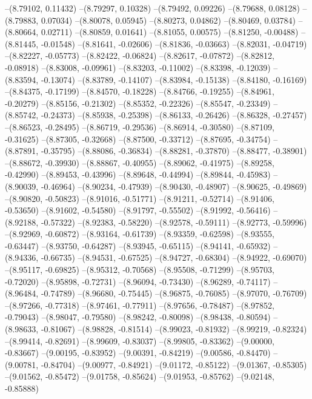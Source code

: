 --(8.79102, 0.11432)
--(8.79297, 0.10328)
--(8.79492, 0.09226)
--(8.79688, 0.08128)
--(8.79883, 0.07034)
--(8.80078, 0.05945)
--(8.80273, 0.04862)
--(8.80469, 0.03784)
--(8.80664, 0.02711)
--(8.80859, 0.01641)
--(8.81055, 0.00575)
--(8.81250, -0.00488)
--(8.81445, -0.01548)
--(8.81641, -0.02606)
--(8.81836, -0.03663)
--(8.82031, -0.04719)
--(8.82227, -0.05773)
--(8.82422, -0.06824)
--(8.82617, -0.07872)
--(8.82812, -0.08918)
--(8.83008, -0.09961)
--(8.83203, -0.11002)
--(8.83398, -0.12039)
--(8.83594, -0.13074)
--(8.83789, -0.14107)
--(8.83984, -0.15138)
--(8.84180, -0.16169)
--(8.84375, -0.17199)
--(8.84570, -0.18228)
--(8.84766, -0.19255)
--(8.84961, -0.20279)
--(8.85156, -0.21302)
--(8.85352, -0.22326)
--(8.85547, -0.23349)
--(8.85742, -0.24373)
--(8.85938, -0.25398)
--(8.86133, -0.26426)
--(8.86328, -0.27457)
--(8.86523, -0.28495)
--(8.86719, -0.29536)
--(8.86914, -0.30580)
--(8.87109, -0.31625)
--(8.87305, -0.32668)
--(8.87500, -0.33712)
--(8.87695, -0.34754)
--(8.87891, -0.35795)
--(8.88086, -0.36834)
--(8.88281, -0.37870)
--(8.88477, -0.38901)
--(8.88672, -0.39930)
--(8.88867, -0.40955)
--(8.89062, -0.41975)
--(8.89258, -0.42990)
--(8.89453, -0.43996)
--(8.89648, -0.44994)
--(8.89844, -0.45983)
--(8.90039, -0.46964)
--(8.90234, -0.47939)
--(8.90430, -0.48907)
--(8.90625, -0.49869)
--(8.90820, -0.50823)
--(8.91016, -0.51771)
--(8.91211, -0.52714)
--(8.91406, -0.53650)
--(8.91602, -0.54580)
--(8.91797, -0.55502)
--(8.91992, -0.56416)
--(8.92188, -0.57322)
--(8.92383, -0.58220)
--(8.92578, -0.59111)
--(8.92773, -0.59996)
--(8.92969, -0.60872)
--(8.93164, -0.61739)
--(8.93359, -0.62598)
--(8.93555, -0.63447)
--(8.93750, -0.64287)
--(8.93945, -0.65115)
--(8.94141, -0.65932)
--(8.94336, -0.66735)
--(8.94531, -0.67525)
--(8.94727, -0.68304)
--(8.94922, -0.69070)
--(8.95117, -0.69825)
--(8.95312, -0.70568)
--(8.95508, -0.71299)
--(8.95703, -0.72020)
--(8.95898, -0.72731)
--(8.96094, -0.73430)
--(8.96289, -0.74117)
--(8.96484, -0.74789)
--(8.96680, -0.75445)
--(8.96875, -0.76085)
--(8.97070, -0.76709)
--(8.97266, -0.77318)
--(8.97461, -0.77911)
--(8.97656, -0.78487)
--(8.97852, -0.79043)
--(8.98047, -0.79580)
--(8.98242, -0.80098)
--(8.98438, -0.80594)
--(8.98633, -0.81067)
--(8.98828, -0.81514)
--(8.99023, -0.81932)
--(8.99219, -0.82324)
--(8.99414, -0.82691)
--(8.99609, -0.83037)
--(8.99805, -0.83362)
--(9.00000, -0.83667)
--(9.00195, -0.83952)
--(9.00391, -0.84219)
--(9.00586, -0.84470)
--(9.00781, -0.84704)
--(9.00977, -0.84921)
--(9.01172, -0.85122)
--(9.01367, -0.85305)
--(9.01562, -0.85472)
--(9.01758, -0.85624)
--(9.01953, -0.85762)
--(9.02148, -0.85888)
